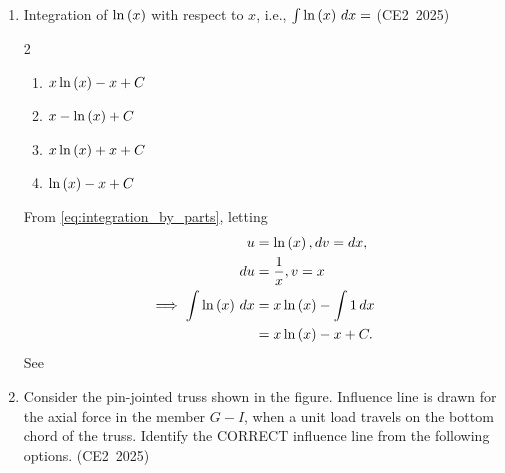 \begin{enumerate}[label=\thesubsection.\arabic*, ref=\thesubsection.\theenumi,itemsep=0pt]
\begin{multicols}{4}\begin{enumerate}
    \item $\myvec{2&1&4\\3&4&3\\4&5&2}$
    \item $\myvec{4&3&2\\5&4&1\\2&3&4}$
    \item $\myvec{4&2&3\\5&1&4\\2&4&3}$
    \item $\myvec{2&3&4\\1&4&5\\4&3&2}$
\end{enumerate}\end{multicols}
%
\solution
Using the following code,
\begin{align}
    \vec{A}^{\top}
    = \myvec{
        2 & 1 & 4 \\
        3 & 4 & 3 \\
        4 & 5 & 2
    }.
\end{align}
%
\item
Integration of $\ln\left(x\right)$ with respect to $x$, i.e.,
$\int\ln\left(x\right)\,dx=$\underline{\hspace{3cm}}
\hfill (CE2~2025)

\begin{multicols}{2}\begin{enumerate}
    \item $x\ln\left(x\right)-x+C$
    \item $x-\ln\left(x\right)+C$
    \item $x\ln\left(x\right)+x+C$
    \item $\ln\left(x\right)-x+C$
\end{enumerate}\end{multicols}
%
\solution
From \eqref{eq:integration_by_parts},
letting
\begin{align}
	u&=\ln\left(x\right), dv=dx,
\\
	du &= \frac{1}{x}, v = x
\\
\implies
    \int\ln\left(x\right)\,dx
    &=x\ln\left(x\right) -\int1\,dx \\
    &=x\ln\left(x\right)-x+C.
\end{align}
\iffalse
See
%
\item
Consider the pin-jointed truss shown in the figure. Influence line is drawn for
the axial force in the member $G-I$, when a unit load travels on the bottom
chord of the truss. Identify the CORRECT influence line from the following
options.
\hfill (CE2~2025)


\end{enumerate}
